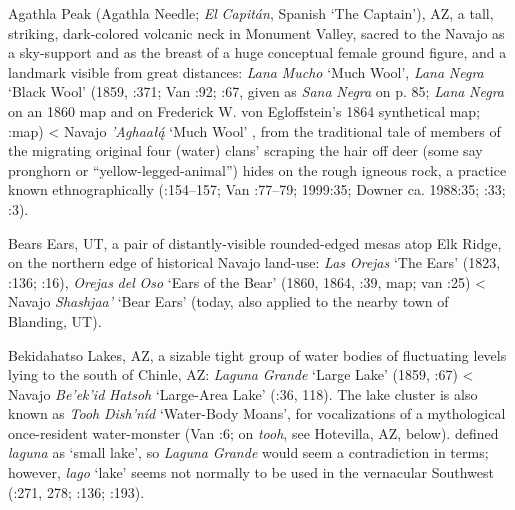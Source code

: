 Agathla Peak (Agathla Needle; \textit{El} \textit{Capitán}, Spanish ‘The Captain’), AZ, a tall, striking, dark-colored volcanic neck in Monument Valley, sacred to the Navajo as a sky-support and as the breast of a huge conceptual female ground figure, and a landmark visible from great distances:  \textit{Lana} \textit{Mucho} ‘Much Wool’, \textit{Lana} \textit{Negra} ‘Black Wool’ (1859, \citealt{McNitt1972}:371; Van \citealt{Valkenburgh1945}:92; \citealt{Bailey1964a}:67, given as \textit{Sana} \textit{Negra} on p. 85; \textit{Lana} \textit{Negra} on an 1860 map and on Frederick W. von Egloffstein’s 1864 synthetical map; \citealt{Madsen2010}:map) < Navajo \textit{’Aghaał\'{ą}} ‘Much Wool’ \citep[48]{Gregory1916}, from the traditional tale of members of the migrating original four (water) clans’ scraping the hair off deer (some say pronghorn or “yellow-legged-animal”) hides on the rough igneous rock, a practice known ethnographically (\citealt{Matthews1897}:154–157; Van \citealt{Valkenburgh1974}:77–79; 1999:35; Downer ca. 1988:35; \citealt{Linford2000}:33; \citealt{Begay2015a}:3). 

Bears Ears, UT, a pair of distantly-visible rounded-edged mesas atop Elk Ridge, on the northern edge of historical Navajo land-use:  \textit{Las} \textit{Orejas} ‘The Ears’ (1823, \citealt{Correll1979}:136; \citealt{Brugge1965}:16), \textit{Orejas} \textit{del} \textit{Oso} ‘Ears of the Bear’ (1860, 1864, \citealt{Madsen2010}:39, map; van \citealt{Cott1990}:25) < Navajo \textit{Shashjaa’} ‘Bear Ears’ (today, also applied to the nearby town of Blanding, UT).

Bekidahatso Lakes, AZ, a sizable tight group of water bodies of fluctuating levels lying to the south of Chinle, AZ:  \textit{Laguna} \textit{Grande} ‘Large Lake’ (1859, \citealt{Bailey1964a}:67) < Navajo \textit{Be’ek’id} \textit{Hatsoh} ‘Large-Area Lake’ (\citealt{Gregory1916}:36, 118).  The lake cluster is also known as \textit{Tooh} \textit{Dish’níd} ‘Water-Body Moans’, for vocalizations of a mythological once-resident water-monster (Van \citealt{Valkenburgh1999}:6; on \textit{tooh}, see Hotevilla, AZ, below).  \citet[76]{Studerus2001} defined \textit{laguna} as ‘small lake’, so \textit{Laguna} \textit{Grande} would seem a contradiction in terms; however, \textit{lago} ‘lake’ seems not normally to be used in the vernacular Southwest (\citealt{BillsVigil2008}:271, 278; \citealt{Cobos1983}:136; \citealt{Julyan1996}:193).

